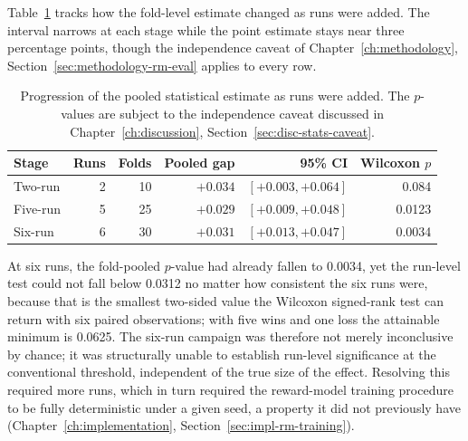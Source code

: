 Table~\ref{tab:evidence-progression} tracks how the fold-level estimate changed
as runs were added. The interval narrows at each stage while the point estimate
stays near three percentage points, though the independence caveat of
Chapter~\ref{ch:methodology}, Section~\ref{sec:methodology-rm-eval} applies to
every row.

\begin{table}[htbp]
\centering
\caption[Progression of the pooled estimate as runs were added]{Progression of the pooled statistical estimate as runs were added. The
$p$-values are subject to the independence caveat discussed in
Chapter~\ref{ch:discussion}, Section~\ref{sec:disc-stats-caveat}.}
\label{tab:evidence-progression}
\begin{tabular}{lrrrrr}
\toprule
Stage & Runs & Folds & Pooled gap & 95\% CI & Wilcoxon $p$ \\
\midrule
Two-run  & 2 & 10 & $+0.034$ & $[+0.003, +0.064]$ & 0.084 \\
Five-run & 5 & 25 & $+0.029$ & $[+0.009, +0.048]$ & 0.0123 \\
Six-run  & 6 & 30 & $+0.031$ & $[+0.013, +0.047]$ & 0.0034 \\
\bottomrule
\end{tabular}
\end{table}

At six runs, the fold-pooled $p$-value had already fallen to 0.0034, yet the
run-level test could not fall below 0.0312 no matter how consistent the six runs
were, because that is the smallest two-sided value the Wilcoxon signed-rank test
can return with six paired observations; with five wins and one loss the
attainable minimum is 0.0625. The six-run campaign was therefore not merely
inconclusive by chance; it was structurally unable to establish run-level
significance at the conventional threshold, independent of the true size of the
effect. Resolving this required more runs, which in turn required the
reward-model training procedure to be fully deterministic under a given seed, a
property it did not previously have
(Chapter~\ref{ch:implementation}, Section~\ref{sec:impl-rm-training}).
